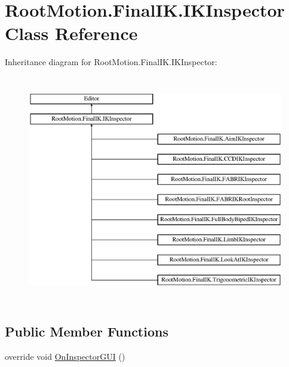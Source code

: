 \hypertarget{class_root_motion_1_1_final_i_k_1_1_i_k_inspector}{}\section{Root\+Motion.\+Final\+I\+K.\+I\+K\+Inspector Class Reference}
\label{class_root_motion_1_1_final_i_k_1_1_i_k_inspector}
Inheritance diagram for Root\+Motion.\+Final\+I\+K.\+I\+K\+Inspector\+:\begin{figure}[H]
\begin{center}
\leavevmode
\includegraphics[height=10.000000cm]{class_root_motion_1_1_final_i_k_1_1_i_k_inspector}
\end{center}
\end{figure}
\subsection*{Public Member Functions}
\begin{DoxyCompactItemize}
\item 
override void \mbox{\hyperlink{class_root_motion_1_1_final_i_k_1_1_i_k_inspector_ab0e6409806547537f952f3cdadb3b9d9}{On\+Inspector\+G\+UI}} ()
\end{DoxyCompactItemize}
